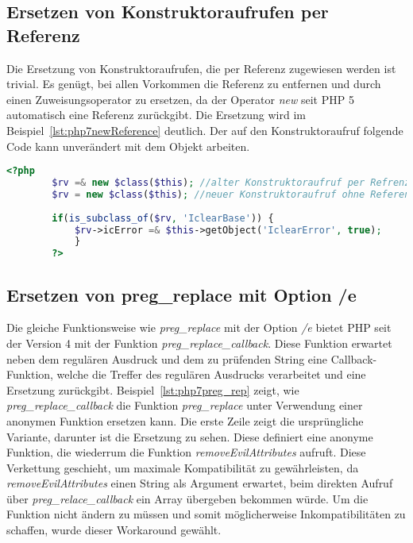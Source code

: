    \subsection{Ersetzen von Konstruktoraufrufen per Referenz}
    Die Ersetzung von Konstruktoraufrufen, die per Referenz zugewiesen werden ist trivial. Es genügt, bei allen Vorkommen die Referenz zu 
    entfernen und durch einen Zuweisungsoperator zu ersetzen, da der Operator \textit{new} seit \ac{PHP} 5 automatisch eine Referenz zurückgibt. 
    Die Ersetzung wird im Beispiel~\ref{lst:php7newReference} deutlich. Der auf den Konstruktoraufruf folgende Code kann unverändert mit dem Objekt arbeiten.
    
    \begin{lstlisting}[language=php, caption={Beispiel der Ersetzung von Konstruktoraufrufen per Referenz}, label={lst:php7newReference}]
        <?php
        $rv =& new $class($this); //alter Konstruktoraufruf per Refrenz
        $rv = new $class($this); //neuer Konstruktoraufruf ohne Referenz
        
        if(is_subclass_of($rv, 'IclearBase')) {
            $rv->icError =& $this->getObject('IclearError', true);
            }
        ?>
    \end{lstlisting}
    
    \subsection{Ersetzen von preg\_replace mit Option /e}\label{preg}
    Die gleiche Funktionsweise wie \textit{preg\_replace} mit der Option \textit{/e} bietet \ac{PHP} seit der Version 4 mit der 
    Funktion \textit{preg\_replace\_callback}. Diese Funktion erwartet neben dem regulären Ausdruck und dem zu prüfenden 
    String eine Callback-Funktion, welche die Treffer des regulären Ausdrucks verarbeitet und eine Ersetzung zurückgibt.
    Beispiel~\ref{lst:php7preg_rep} zeigt, wie \textit{preg\_replace\_callback} die Funktion \textit{preg\_replace} unter 
    Verwendung einer anonymen Funktion ersetzen kann. Die erste Zeile zeigt die ursprüngliche Variante, darunter ist die 
    Ersetzung zu sehen. Diese definiert eine anonyme Funktion, die wiederrum die Funktion \textit{removeEvilAttributes} aufruft. 
    Diese Verkettung geschieht, um maximale Kompatibilität zu gewährleisten, da \textit{removeEvilAttributes} einen String 
    als Argument erwartet, beim direkten Aufruf über \textit{preg\_relace\_callback} ein Array übergeben bekommen würde. Um 
    die Funktion nicht ändern zu müssen und somit möglicherweise Inkompatibilitäten zu schaffen, wurde dieser Workaround 
    gewählt.
        
